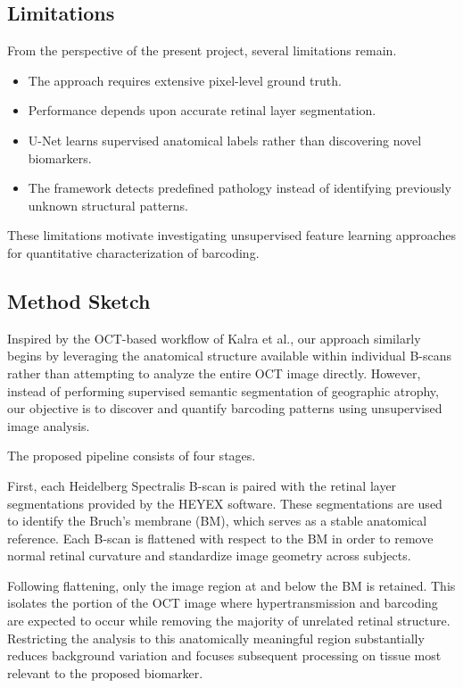 \documentclass[11pt]{article}
\begin{document}
\subsection{Limitations}

From the perspective of the present project, several limitations remain.

\begin{itemize}
    \item The approach requires extensive pixel-level ground truth.
    \item Performance depends upon accurate retinal layer segmentation.
    \item U-Net learns supervised anatomical labels rather than discovering novel biomarkers.
    \item The framework detects predefined pathology instead of identifying previously unknown structural patterns.
\end{itemize}

These limitations motivate investigating unsupervised feature learning approaches for quantitative characterization of barcoding.

\subsection{Method Sketch}

Inspired by the OCT-based workflow of Kalra et al., our approach similarly begins by leveraging the anatomical structure available within individual B-scans rather than attempting to analyze the entire OCT image directly. However, instead of performing supervised semantic segmentation of geographic atrophy, our objective is to discover and quantify barcoding patterns using unsupervised image analysis.

The proposed pipeline consists of four stages.

First, each Heidelberg Spectralis B-scan is paired with the retinal layer segmentations provided by the HEYEX software. These segmentations are used to identify the Bruch's membrane (BM), which serves as a stable anatomical reference. Each B-scan is flattened with respect to the BM in order to remove normal retinal curvature and standardize image geometry across subjects.

Following flattening, only the image region at and below the BM is retained. This isolates the portion of the OCT image where hypertransmission and barcoding are expected to occur while removing the majority of unrelated retinal structure. Restricting the analysis to this anatomically meaningful region substantially reduces background variation and focuses subsequent processing on tissue most relevant to the proposed biomarker.
\end{document}
